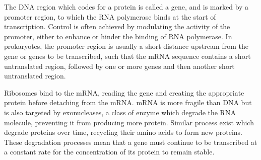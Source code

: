 \documentclass[twoside,a4paper]{article}
\begin{document}
\begin{multicols}{2}
The DNA region which codes for a protein is called a gene, and is marked by a
promoter region, to which the RNA polymerase binds at the start of
transcription.
Control is often achieved by modulating the activity of the promoter, either to
enhance or hinder the binding of RNA polymerase.
In prokaryotes, the promoter region is usually a short distance upstream from
the gene or genes to be transcribed, such that the mRNA sequence contains a
short untranslated region, followed by one or more genes and then another short
untranslated region.

Ribosomes bind to the mRNA, reading the gene and creating the appropriate
protein before detaching from the mRNA.
mRNA is more fragile than DNA but is also targeted by exonucleases, a class of
enzyme which degrade the RNA molecule, preventing it from producing more
protein.
Similar process exist which degrade proteins over time, recycling their amino
acids to form new proteins.
These degradation processes mean that a gene must continue to be transcribed at
a constant rate for the concentration of its protein to remain stable.


\tiny






\end{multicols}
\end{document}
